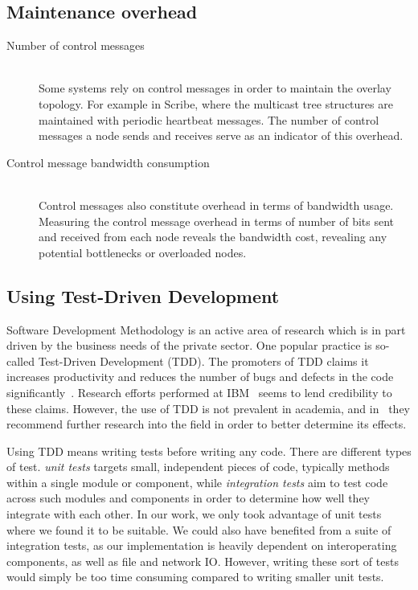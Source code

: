\subsection{Maintenance overhead}

\begin{description}
\item[Number of control messages]\hfill\\

Some systems rely on control messages in order to maintain the overlay
topology. For example in Scribe, where the multicast tree structures are
maintained with periodic heartbeat messages. The number of control
messages a node sends and receives serve as an indicator of this
overhead.

\item[Control message bandwidth consumption]\hfill\\

Control messages also constitute overhead in terms of bandwidth usage.
Measuring the control message overhead in terms of number of bits sent
and received from each node reveals the bandwidth cost, revealing any
potential bottlenecks or overloaded nodes.

\end{description}

\subsection{Using Test-Driven Development}

Software Development Methodology is an active area of research
which is in part driven by the business needs of the private
sector\cite{janzen2005test}. One popular practice is so-called Test-Driven
Development (TDD). The promoters of TDD claims it increases
productivity and reduces the number of bugs and defects in the
code significantly~\cite{beck2003test}. Research
efforts performed at IBM~\cite{maximilien2003assessing} seems to
lend credibility to these claims. However, the use of TDD is not
prevalent in academia, and in~\cite{janzen2005test} they
recommend further research into the field in order to better
determine its effects.

Using TDD means writing tests before writing any code. There are
different types of test. \emph{unit tests} targets small,
independent pieces of code, typically methods within a single
module or component, while \emph{integration tests} aim to test
code across such modules and components in order to determine
how well they integrate with each other. In our work, we only
took advantage of unit tests where we found it to be suitable.
We could also have benefited from a suite of integration tests,
as our implementation is heavily dependent on interoperating
components, as well as file and network IO\@. However, writing
these sort of tests would simply be too time consuming compared
to writing smaller unit tests.

